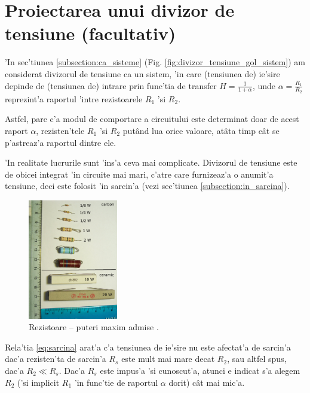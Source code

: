 \section[Proiectarea unui divizor de tensiune]{Proiectarea unui divizor de tensiune (facultativ)}

'In sec'tiunea \ref{subsection:ca_sisteme} (Fig. \ref{fig:divizor_tensiune_gol_sistem}) am considerat divizorul de tensiune ca un sistem, 'in care (tensiunea de) ie'sire depinde de (tensiunea de) intrare prin func'tia de transfer $H = \frac{1}{1+\alpha}$, unde $\alpha = \frac{R_1}{R_2}$ reprezint'a raportul 'intre rezistoarele ${R_1}$ 'si $R_2$. 

Astfel, pare c'a modul de comportare a circuitului este determinat doar de acest raport $\alpha$, rezisten'tele ${R_1}$ 'si $R_2$ put\^and lua orice valoare, at\^ata timp c\^at se p'astreaz'a raportul dintre ele. 

'In realitate lucrurile sunt 'ins'a ceva mai complicate. Divizorul de tensiune este de obicei integrat 'in circuite mai mari, c'atre care furnizeaz'a o anumit'a tensiune, deci este folosit 'in sarcin'a (vezi sec'tiunea \ref{subsection:in_sarcina}). 

\begin{figure}[!b]
	\centering
		\includegraphics[width=0.35\textwidth]{laborator_01/figuri/7_resistors_power_ratings}
	\caption{Rezistoare -- puteri maxim admise \cite{rezistoare_puteri}.}
	\label{fig:rezistoare_puteri}
\end{figure}

Rela'tia \ref{eq:sarcina} arat'a c'a tensiunea de ie'sire nu este afectat'a de sarcin'a dac'a rezisten'ta de sarcin'a $R_s$ este mult mai mare decat $R_2$, sau altfel spus, dac'a $R_2 \ll R_s$. Dac'a $R_s$ este impus'a 'si cunoscut'a, atunci e indicat s'a alegem $R_2$ ('si implicit $R_1$ 'in func'tie de raportul $\alpha$ dorit) c\^at mai mic'a. 

